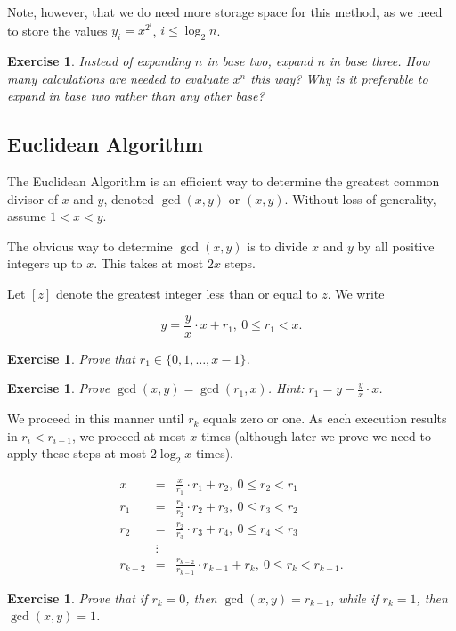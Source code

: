 \documentclass[12pt,letterpaper]{report}
\newcommand\be{\begin{equation}}
\newcommand\ee{\end{equation}}
\newcommand\bea{\begin{eqnarray}}
\newcommand\eea{\end{eqnarray}}
\newtheorem{exe}[thm]{Exercise}
\begin{document}
Note, however, that we do need more storage space for this method,
as we need to store the values $y_i = x^{2^i}$, $i \le \log_2n$.

\begin{exe} Instead of expanding $n$ in base two, expand $n$ in
base three. How many calculations are needed to evaluate $x^n$
this way? Why is it preferable to expand in base two rather than
any other base?
\end{exe}


\subsection{Euclidean Algorithm}

The Euclidean Algorithm is an efficient way to determine the
greatest common divisor of $x$ and $y$, denoted $\gcd(x,y)$ or
$(x,y)$. Without loss of generality, assume $1 < x < y$.

The obvious way to determine $\gcd(x,y)$ is to divide $x$ and $y$
by all positive integers up to $x$. This takes at most $2x$ steps.

Let $[z]$ denote the greatest integer less than or equal to $z$.
We write

\be y = \frac{y}{x} \cdot x + r_1, \ 0 \le r_1 < x. \ee

\begin{exe} Prove that $r_1 \in \{0, 1, \dots, x-1\}$.
\end{exe}

\begin{exe} Prove $\gcd(x,y) = \gcd(r_1,x)$. Hint: $r_1 = y -
\frac{y}{x} \cdot x$.
\end{exe}

We proceed in this manner until $r_k$ equals zero or one. As each
execution results in $r_i < r_{i-1}$, we proceed at most $x$ times
(although later we prove we need to apply these steps at most $2
\log_2 x$ times).

\bea x &=& \frac{x}{r_1} \cdot r_1 + r_2, \ 0 \le r_2 < r_1
\nonumber\\ r_1 &=& \frac{r_1}{r_2} \cdot r_2 + r_3, \ 0 \le r_3 <
r_2 \nonumber\\ r_2 &=& \frac{r_2}{r_3} \cdot r_3 + r_4, \ 0 \le
r_4 < r_3 \nonumber\\ & \vdots & \nonumber\\ r_{k-2} &=&
\frac{r_{k-2}}{r_{k-1}} \cdot r_{k-1} + r_k, \ 0 \le r_k <
r_{k-1}. \eea

\begin{exe} Prove that if $r_k = 0$, then $\gcd(x,y) = r_{k-1}$,
while if $r_k = 1$, then $\gcd(x,y) = 1$.
\end{exe}
\end{document}
